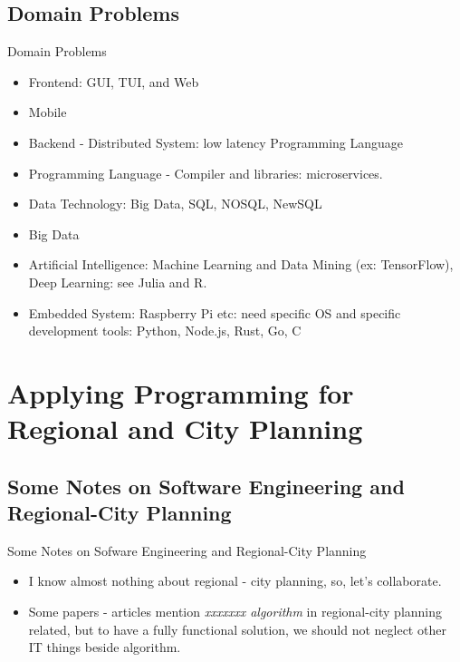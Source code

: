 \documentclass[10pt]{beamer}
\begin{document}
  \subsection{Domain Problems}

    \begin{frame}[fragile]{Domain Problems}

        \begin{itemize}
          \item Frontend: GUI, TUI, and Web
          \item Mobile
          \item Backend - Distributed System: low latency Programming Language
          \item Programming Language - Compiler and libraries: microservices. 
          \item Data Technology: Big Data, SQL, NOSQL, NewSQL
          \item Big Data
          \item Artificial Intelligence: Machine Learning and Data Mining (ex: TensorFlow), Deep Learning: see Julia and R.
          \item Embedded System: Raspberry Pi etc: need specific OS and specific development tools: Python, Node.js, Rust, Go, C
        \end{itemize}
      \end{frame}

\section{Applying Programming for Regional and City Planning}

  \subsection{Some Notes on Software Engineering and Regional-City Planning}

    \begin{frame}[fragile]{Some Notes on Sofware Engineering and Regional-City Planning}

        \begin{itemize}
          \item I know almost nothing about regional - city planning, so, let's collaborate.
          \item Some papers - articles mention \textit{xxxxxxx algorithm} in regional-city planning
            related, but to have a fully functional solution, we should not neglect other IT things
            beside algorithm. 
        \end{itemize}

      \end{frame}
\end{document}
